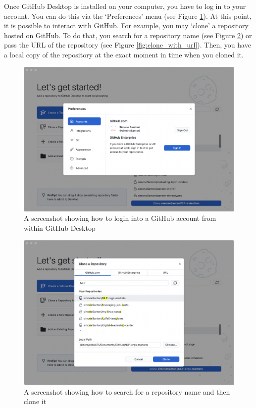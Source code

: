 \documentclass[a4paper,11pt]{book}
\begin{document}
\begin{appendices}
\quad Once GitHub Desktop is installed on your computer, you have to log in to your account. You can do this via the `Preferences' menu (see Figure \ref{fig:github_login}). At this point, it is possible to interact with GitHub. For example, you may `clone' a repository hosted on GitHub. To do that, you search for a repository name (see Figure \ref{fig:fetch_name_and_clone}) or pass the URL of the repository (see Figure \ref{fig:clone_with_url}). Then, you have a local copy of the repository at the exact moment in time when you cloned it. 

\begin{figure}[!htbp]
	\centering
	\includegraphics[width=1\textwidth]{github_desktop_login}
	\caption{A screenshot showing how to login into a GitHub account from within GitHub Desktop}
	\label{fig:github_login}
\end{figure}

\begin{figure}[!htbp]
	\includegraphics[width=1\textwidth]{fetch_name_and_clone}
	\caption{A screenshot showing how to search for a repository name and then clone it}
	\label{fig:fetch_name_and_clone}
\end{figure}


\end{appendices}
\end{document}
